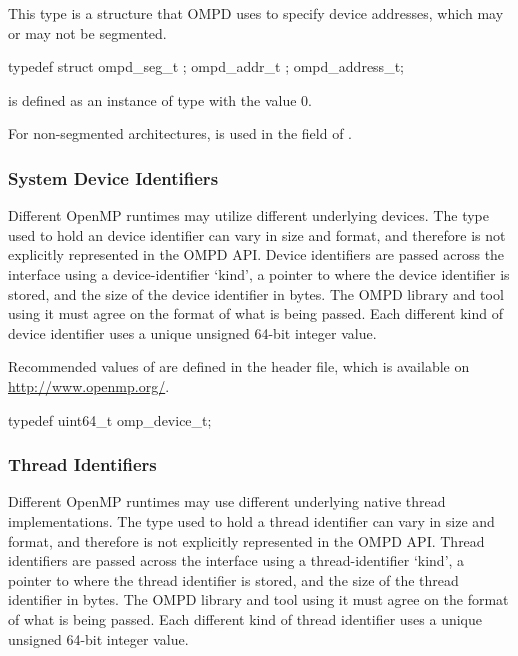 This type is a structure that OMPD uses to specify device addresses,
which may or may not be segmented.

\format

\begin{ccppspecific}
\begin{ompEnv}
typedef struct {
  ompd_seg_t ;
  ompd_addr_t ;
} ompd_address_t;
\end{ompEnv}
\end{ccppspecific}

 is defined as an instance of type  with 
the value 0.

For non-segmented architectures,  is used in the 
 field of .

\subsubsection{System Device Identifiers}

Different OpenMP runtimes may utilize different underlying devices.
The type used to hold an device identifier can vary in size and format, and
therefore is not explicitly represented in the OMPD API. Device identifiers are
passed across the interface using a device-identifier `kind', a pointer to where
the device identifier is stored, and the size of the device identifier in bytes.
The OMPD library and tool using it must agree on the format
of what is being passed.
Each different kind of device identifier uses a unique
unsigned 64-bit integer value.

Recommended values of  are defined in the 
header file, which is available on \url{http://www.openmp.org/}.

\label{ompd:omp_device_t}
\format

\begin{ccppspecific}
\begin{ompSyntax}
typedef uint64_t omp_device_t;
\end{ompSyntax}
\end{ccppspecific}


\subsubsection{Thread Identifiers}

Different OpenMP runtimes may use different underlying native
thread implementations.
The type used to hold a thread identifier can vary in size and format, and
therefore is not explicitly represented in the OMPD API. Thread identifiers are
passed across the interface using a thread-identifier `kind', a pointer to where
the thread identifier is stored, and the size of the thread identifier in bytes.
The OMPD library and tool using it must agree on the format
of what is being passed.
Each different kind of thread identifier uses a unique
unsigned 64-bit integer value.

